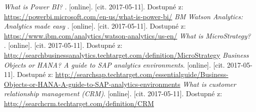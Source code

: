 \begin{thebibliography}{99}
\textit{What is Power BI? }.
[online]. [cit. 2017-05-11]. Dostupné z:  \url{https://powerbi.microsoft.com/en-us/what-is-power-bi/}
\textit{BM Watson Analytics: Analytics made easy }.
[online]. [cit. 2017-05-11]. Dostupné z: \url{https://www.ibm.com/analytics/watson-analytics/us-en/}
\textit{What is MicroStrategy? }.
[online]. [cit. 2017-05-11]. Dostupné z: \url{http://searchbusinessanalytics.techtarget.com/definition/MicroStrategy}
\textit{Business Objects or HANA? A guide to SAP analytics environments}.
[online]. [cit. 2017-05-11]. Dostupné z: \url{http://searchsap.techtarget.com/essentialguide/Business-Objects-or-HANA-A-guide-to-SAP-analytics-environments}
\textit{What is customer relationship management (CRM)}.
[online]. [cit. 2017-05-11]. Dostupné z: \url{http://searchcrm.techtarget.com/definition/CRM}
\label{LastPage}
\end{thebibliography}
